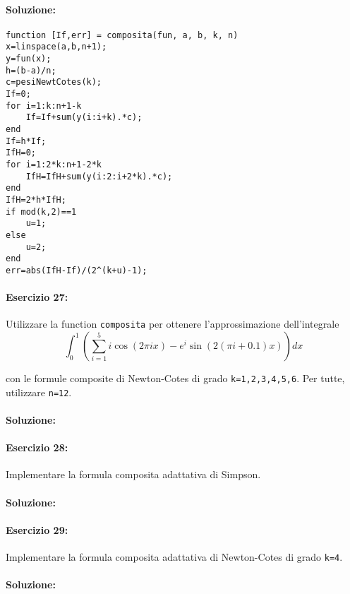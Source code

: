 \documentclass[12pt]{article}
\begin{document}
\paragraph{Soluzione:}



\begin{lstlisting}[frame=single]
function [If,err] = composita(fun, a, b, k, n)
x=linspace(a,b,n+1);
y=fun(x);
h=(b-a)/n;
c=pesiNewtCotes(k);
If=0;
for i=1:k:n+1-k
    If=If+sum(y(i:i+k).*c);
end
If=h*If;
IfH=0;
for i=1:2*k:n+1-2*k
    IfH=IfH+sum(y(i:2:i+2*k).*c);
end
IfH=2*h*IfH;
if mod(k,2)==1
    u=1;
else
    u=2;
end
err=abs(IfH-If)/(2^(k+u)-1);
\end{lstlisting}


\paragraph{Esercizio 27:}
Utilizzare la function \texttt{composita} per ottenere l’approssimazione dell’integrale\\

$$\int_{0}^{1}(\sum_{i=1}^{5}i\cos(2\pi{ix})-e^{i}\sin(2(\pi{i}+0.1)x))dx$$

con le formule composite di Newton-Cotes di grado \texttt{k=1,2,3,4,5,6}. Per tutte, utilizzare \texttt{n=12}.

\paragraph{Soluzione:}


\paragraph{Esercizio 28:}
Implementare la formula composita adattativa di Simpson.

\paragraph{Soluzione:}


\paragraph{Esercizio 29:}
Implementare la formula composita adattativa di Newton-Cotes di grado \texttt{k=4}.

\paragraph{Soluzione:}
\end{document}
